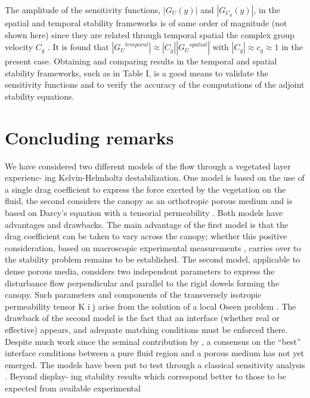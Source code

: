 The amplitude of the sensitivity functions, $|G_{U} ( y)|$ and $|G_{C_d} (y)|$, in the spatial and temporal
stability frameworks is of same order of magnitude (not shown here) since they are related through
temporal spatial the complex group velocity $C_g$ . It is found that $|{G_U}^{temporal}| \approx |C_g ||{G_U}^{spatial}|$ with $|C_g | \approx c_g \approx 1$ in the
present case.
Obtaining and comparing results in the temporal and spatial stability frameworks, such as in
Table I, is a good means to validate the sensitivity functions and to verify the accuracy of the
computations of the adjoint stability equations.


\section{Concluding remarks}
We have considered two different models of the flow through a vegetated layer experienc-
ing Kelvin-Helmholtz destabilization. One model is based on the use of a single drag coefficient
to express the force exerted by the vegetation on the fluid, the second considers the canopy as
an orthotropic porous medium and is based on Darcy’s equation with a tensorial permeability \citet{zampogna2016fluid}. 
Both models have advantages and drawbacks. The main advantage of the first model is that the
drag coefficient can be taken to vary across the canopy; whether this positive consideration, based
on macroscopic experimental measurements \citet{ghisalberti2002mixing} \citet{ghisalberti2004limited} \citet{ghisalberti2005mass},  carries over to the stability problem remains to
be established. The second model, applicable to dense porous media, considers two independent
parameters to express the disturbance flow perpendicular and parallel to the rigid dowels forming
the canopy. Such parameters and components of the transversely isotropic permeability tensor K i j
arise from the solution of a local Oseen problem \citet{zampogna2016fluid}. The drawback of the second model is the
fact that an interface (whether real or effective) appears, and adequate matching conditions must
be enforced there. Despite much work since the seminal contribution by \citet{beaver}, a
consensus on the “best” interface conditions between a pure fluid region and a porous medium has
not yet emerged.
The models have been put to test through a classical sensitivity analysis \citet{bottaro2003effect}. Beyond display-
ing stability results which correspond better to those to be expected from available experimental
